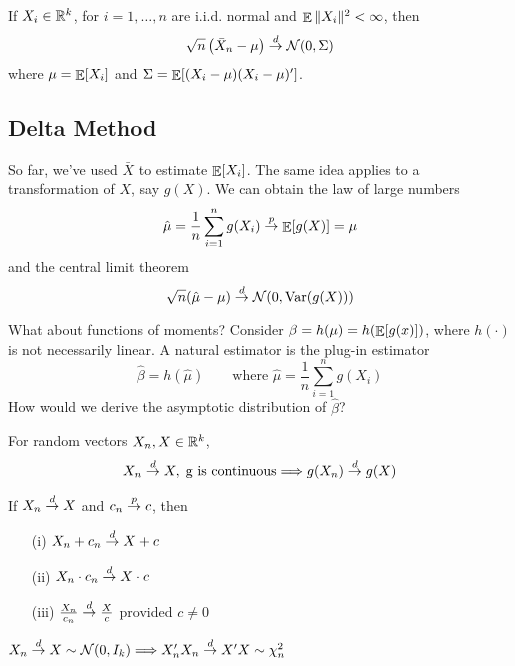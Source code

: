 \documentclass[10pt]{article}
\begin{document}
\begin{theorem}
	 If $X_i \in \mathbb{R}^k$, for $i = 1,\dots,n$ are i.i.d. normal and $\mathop{\mathbb{E}} \|X_i\|^2 < \infty$, then
	\[
	\sqrt{n}\left( \bar{X}_n - \mu\right) \overset{d}{\to} \mathcal{N}(0,\Sigma)
	\]
	where $\mu = \mathop{\mathbb{E}}[X_i]$ and $\Sigma = \mathop{\mathbb{E}}[(X_i - \mu)(X_i - \mu)']$.
\end{theorem}

\subsection{Delta Method}

\begin{remark}
	So far, we've used $\bar{X}$ to estimate $\mathop{\mathbb{E}}[X_i]$. The same idea applies to a transformation of $X$, say $g(X)$. We can obtain the law of large numbers
	\[
	\hat{\mu} = \frac{1}{n} \sum_{i=1}^n g(X_i) \overset{p}{\to} \mathop{\mathbb{E}}[g(X)] = \mu
	\]
	and the central limit theorem
	\[
	\sqrt{n}(\hat{\mu} - \mu) \overset{d}{\to} \mathcal{N}(0,\mathop{\rm Var}(g(X)))
	\]
\end{remark}

What about functions of moments? Consider $\beta = h(\mu) = h(\mathop{\mathbb{E}}[g(x)])$, where $h(\cdot)$ is not necessarily linear. A natural estimator is the plug-in estimator
\[
\hat{\beta} = h(\hat{\mu})\qquad \text{where } \hat{\mu} = \frac{1}{n}\sum_{i=1}^n g(X_i)
\]
How would we derive the asymptotic distribution of $\hat{\beta}$?

\begin{theorem}
	 For random vectors $X_n,X \in \mathbb{R}^k$,
	\[
	X_n \overset{d}{\to} X,\;\text{g is continuous} \Longrightarrow g(X_n) \overset{d}{\to} g(X)
	\]
\end{theorem}

\begin{corollary} 
	If $X_n \overset{d}{\to} X$ and $c_n \overset{p}{\to} c$, then
	\begin{itemize}
		\item[(i)] $X_n + c_n \overset{d}{\to} X + c$
		
		\item[(ii)] $X_n\cdot c_n \overset{d}{\to} X\cdot c$
		
		\item[(iii)] $\frac{X_n}{c_n} \overset{d}{\to} \frac{X}{c}$ provided $c \ne 0$
	\end{itemize}
\end{corollary}

\begin{example}
	$X_n \overset{d}{\to} X \sim \mathcal{N}(0,I_k) \Longrightarrow X_n'X_n \overset{d}{\to} X'X \sim \chi_n^2$
\end{example}
\end{document}
